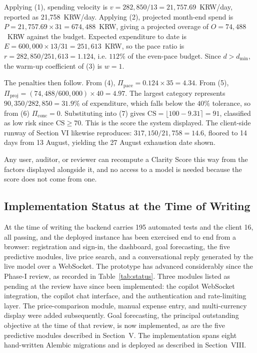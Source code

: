 \documentclass[conference]{IEEEtran}
\begin{document}
Applying (1), spending velocity is $v = 282{,}850 / 13 = 21{,}757.69$~KRW/day, reported as 21{,}758~KRW/day. Applying (2), projected month-end spend is $P = 21{,}757.69 \times 31 = 674{,}488$~KRW, giving a projected overage of $O = 74{,}488$~KRW against the budget. Expected expenditure to date is $E = 600{,}000 \times 13/31 = 251{,}613$~KRW, so the pace ratio is $r = 282{,}850 / 251{,}613 = 1.124$, i.e. $112\%$ of the even-pace budget. Since $d > d_{\min}$, the warm-up coefficient of (3) is $w = 1$.

The penalties then follow. From (4), $\Pi_{\text{pace}} = 0.124 \times 35 = 4.34$. From (5), $\Pi_{\text{proj}} = (74{,}488/600{,}000) \times 40 = 4.97$. The largest category represents $90{,}350/282{,}850 = 31.9\%$ of expenditure, which falls below the $40\%$ tolerance, so from (6) $\Pi_{\text{conc}} = 0$. Substituting into (7) gives $\mathrm{CS} = \lfloor 100 - 9.31 \rceil = 91$, classified as low risk since $\mathrm{CS} \geq 70$. This is the score the system displayed. The client-side runway of Section VI likewise reproduces: $317{,}150 / 21{,}758 = 14.6$, floored to 14 days from 13 August, yielding the 27 August exhaustion date shown.

Any user, auditor, or reviewer can recompute a Clarity Score this way from the factors displayed alongside it, and no access to a model is needed because the score does not come from one.

\subsection{Implementation Status at the Time of Writing}

At the time of writing the backend carries 195 automated tests and the client 16, all passing, and the deployed instance has been exercised end to end from a browser: registration and sign-in, the dashboard, goal forecasting, the five predictive modules, live price search, and a conversational reply generated by the live model over a WebSocket. The prototype has advanced considerably since the Phase-I review, as recorded in Table~\ref{tab:status}. Three modules listed as pending at the review have since been implemented: the copilot WebSocket integration, the copilot chat interface, and the authentication and rate-limiting layer. The price-comparison module, manual expense entry, and multi-currency display were added subsequently. Goal forecasting, the principal outstanding objective at the time of that review, is now implemented, as are the five predictive modules described in Section~V. The implementation spans eight hand-written Alembic migrations and is deployed as described in Section~VIII.
\end{document}
